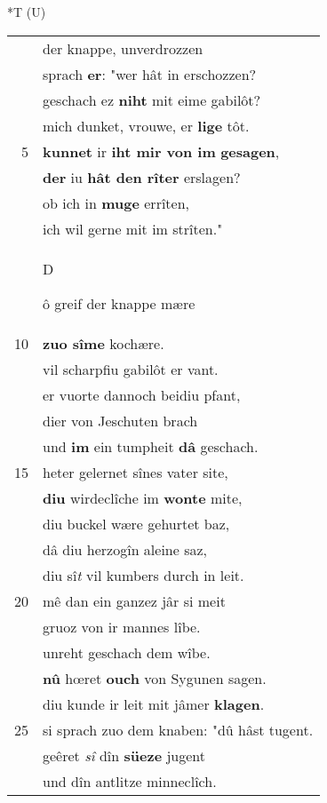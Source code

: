 \documentclass[8pt,a4paper,notitlepage]{article}
\begin{document}
\begin{table}[ht]
\begin{minipage}[t]{0.5\linewidth}
\small
\begin{center}*T (U)
\end{center}
\begin{tabular}{rl}
 & der knappe, unverdrozzen\\ 
 & sprach \textbf{er}: "wer hât in erschozzen?\\ 
 & geschach ez \textbf{niht} mit eime gabilôt?\\ 
 & mich dunket, vrouwe, er \textbf{lige} tôt.\\ 
5 & \textbf{kunnet} ir \textbf{iht mir von im} \textbf{gesagen},\\ 
 & \textbf{der} iu \textbf{hât den rîter} erslagen?\\ 
 & ob ich in \textbf{muge} errîten,\\ 
 & ich wil gerne mit im strîten."\\ 
 & \begin{large}D\end{large}ô greif der knappe mære\\ 
10 & \textbf{zuo sîme} kochære.\\ 
 & vil scharpfiu gabilôt er vant.\\ 
 & er vuorte dannoch beidiu pfant,\\ 
 & dier von Jeschuten brach\\ 
 & und \textbf{im} ein tumpheit \textbf{dâ} geschach.\\ 
15 & heter gelernet sînes vater site,\\ 
 & \textbf{diu} wirdeclîche im \textbf{wonte} mite,\\ 
 & diu buckel wære gehurtet baz,\\ 
 & dâ diu herzogîn aleine saz,\\ 
 & diu sî\textit{t} vil kumbers durch in leit.\\ 
20 & mê dan ein ganzez jâr si meit\\ 
 & gruoz von ir mannes lîbe.\\ 
 & unreht geschach dem wîbe.\\ 
 & \textbf{nû} hœret \textbf{ouch} von Sygunen sagen.\\ 
 & diu kunde ir leit mit jâmer \textbf{klagen}.\\ 
25 & si sprach zuo dem knaben: "dû hâst tugent.\\ 
 & geêret \textit{sî} dîn \textbf{süeze} jugent\\ 
 & und dîn antlitze minneclîch.\\ 

\end{tabular}
\end{minipage}
\end{table}
\end{document}
